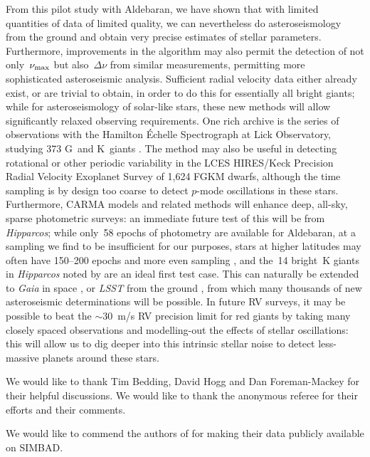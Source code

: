 \documentclass[modern]{aastex61}
\newcommand{\numax}{\mbox{$\nu_{\rm max}$}\xspace}
\newcommand{\Dnu}{\mbox{$\Delta \nu$}\xspace}
\newcommand{\hipparcos}{\emph{Hipparcos}\xspace}
\begin{document}
From this pilot study with Aldebaran, we have shown that with limited quantities of data of limited quality, we can nevertheless do asteroseismology from the ground and obtain very precise estimates of stellar parameters. Furthermore, improvements in the algorithm may also permit the detection of not only~\numax but also~\Dnu from similar measurements, permitting more sophisticated asteroseismic analysis. Sufficient radial velocity data either already exist, or are trivial to obtain, in order to do this for essentially all bright giants; while for asteroseismology of solar-like stars, these new methods will allow significantly relaxed observing requirements. One rich archive is the series of observations with the Hamilton \'{E}chelle Spectrograph at Lick Observatory, studying 373 G~and K~giants \citep[e.g.][]{frink2001,hekker2006,ortiz2016}. The method may also be useful in detecting rotational or other periodic variability in the LCES HIRES/Keck Precision Radial Velocity Exoplanet Survey \citep{butler17} of 1,624 FGKM dwarfs, although the time sampling is by design too coarse to detect $p$-mode oscillations in these stars. Furthermore, CARMA models and related methods will enhance deep, all-sky, sparse photometric surveys: an immediate future test of this will be from \hipparcos; while only~58 epochs of photometry are available for Aldebaran, at a sampling we find to be insufficient for our purposes, stars at higher latitudes may often have 150--200 epochs and more even sampling \citep{hipparcos_phot}, and the~14 bright~K giants in \hipparcos noted by \citet{bedding2000} are an ideal first test case. This can naturally be extended to \emph{Gaia} in space \citep{gaia}, or \emph{LSST} from the ground \citep{dmt,lsst,lsstbook}, from which many thousands of new asteroseismic determinations will be possible. In future RV surveys, it may be possible to beat the \citet{2005PASJ...57...97S} $\sim 30$~m/s RV precision limit for red giants by taking many closely spaced observations and modelling-out the effects of stellar oscillations: this will allow us to dig deeper into this intrinsic stellar noise to detect less-massive planets around these stars.

\acknowledgments

We would like to thank Tim Bedding, David Hogg and Dan Foreman-Mackey for their
helpful discussions.  We would like to thank the anonymous referee for their
efforts and their comments.

We would like to commend the authors of \citet{Hatzes2015} for making their data
publicly available on SIMBAD.
\end{document}
